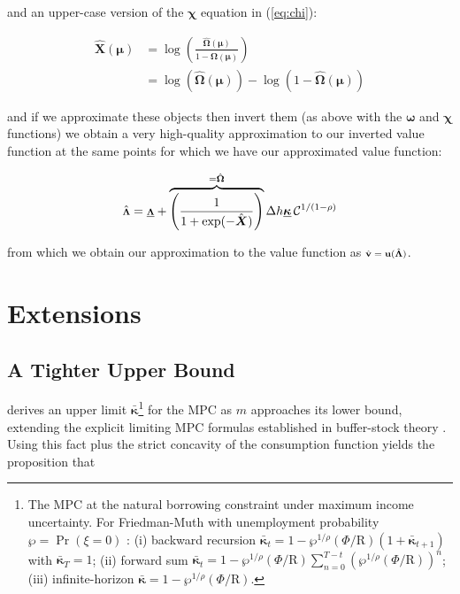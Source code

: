 \documentclass[preprint,authoryear]{elsarticle}
\newcommand{\uFunc}{\mathbf{u}}
\newcommand{\CRRA}{\rho}
\newcommand{\Rfree}{\text{R}}
\newcommand{\tranShk}{\xi}
\newcommand{\WorstProb}{\wp}
\newcommand{\mNrm}{m}
\newcommand{\vFunc}{\mathbf{v}}
\newcommand{\AbsPatFac}{\Phi}
\newcommand{\vInv}{{\scriptsize \boldsymbol{\Lambda}}}
\newcommand{\vInvReal}{\hat{\vInv}}
\newcommand{\hNrm}{h}
\newcommand{\MPC}{\boldsymbol{\kappa}}
\newcommand{\MPCmin}{\underline{\MPC}}
\newcommand{\logmNrmEx}{\boldsymbol{\mu}}
\newcommand{\modRte}{\boldsymbol{\omega}}
\newcommand{\hNrmEx}{\Delta \hNrm}
\newcommand{\logitModRte}{\boldsymbol{\chi}}
\newcommand{\PDVCoverc}{\mathcal{C}}
\newcommand{\vFuncReal}{\hat{\vFunc}}
\newcommand{\vInvPes}{\underline{\vInv}}
\newcommand{\valModRte}{\boldsymbol{\Omega}}
\newcommand{\valModRteReal}{\hat{\valModRte}}
\newcommand{\logitValModRteReal}{\hat{\boldsymbol{X}}}
\newcommand{\MPCmax}{\bar{\MPC}}
\begin{document}
and an upper-case version of the $\logitModRte$ equation in (\ref{eq:chi}):

\begin{equation}
\label{eq:ChiUpper}
\begin{aligned}
\logitValModRteReal(\logmNrmEx) &= \log \left(\frac{\valModRteReal(\logmNrmEx)}{1-\valModRteReal(\logmNrmEx)}\right) \\
&= \log(\valModRteReal(\logmNrmEx)) - \log(1-\valModRteReal(\logmNrmEx))
\end{aligned}
\end{equation}

and if we approximate these objects then invert them (as above with the $\modRte$
and $\logitModRte$ functions) we obtain a very high-quality approximation to our
inverted value function at the same points for which we have our approximated
value function:

\begin{equation}
\label{eq:vInvHi}
\vInvReal = \vInvPes+\overbrace{\left(\frac{1}{1+\exp(-\logitValModRteReal)}\right)}^{=\valModRteReal} \hNrmEx \MPCmin \,\PDVCoverc^{1/(1-\CRRA) }
\end{equation}

from which we obtain our approximation to the value function as $\vFuncReal = \uFunc(\vInvReal)$.

\section{Extensions}

\subsection{A Tighter Upper Bound}

\citet{CarrollShanker2024} derives an upper limit
$\MPCmax$\footnote{The MPC at the natural borrowing constraint under maximum income uncertainty. For Friedman-Muth with unemployment probability $\WorstProb = \Pr(\tranShk = 0)$ \citep{CarrollToche2009}: (i) backward recursion $\MPCmax_{t} = 1 - \WorstProb^{1/\CRRA} (\AbsPatFac/\Rfree) (1 + \MPCmax_{t+1})$ with $\MPCmax_T = 1$; (ii) forward sum $\MPCmax_{t} = 1 - \WorstProb^{1/\CRRA} (\AbsPatFac/\Rfree) \sum_{n=0}^{T -t}\left(\WorstProb^{1/\CRRA} (\AbsPatFac/\Rfree)\right)^{n}$; (iii) infinite-horizon $\MPCmax = 1 - \WorstProb^{1/\CRRA} (\AbsPatFac/\Rfree)$.} for the MPC as $\mNrm$ approaches its
lower bound, extending the explicit limiting MPC formulas established in buffer-stock theory \citep{MaToda2021SavingRateRich}. Using this fact plus the strict concavity of the consumption
function yields the proposition that
\end{document}
